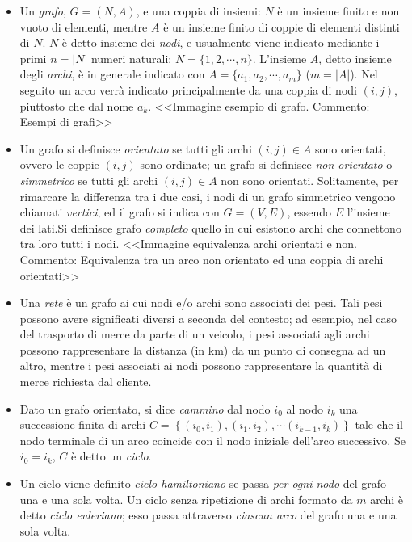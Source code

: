 	\begin{itemize}
		\item Un \emph{grafo}, $G = (N, A)$, e una coppia di insiemi: $N$ è un insieme finito e non vuoto di elementi, mentre $A$ è un insieme finito di coppie di elementi distinti di $N$.
		$N$ è detto insieme dei \emph{nodi}, e usualmente viene indicato mediante i primi $n = |N|$ numeri naturali: $N = \{1 , 2 , \cdots , n \}$. L’insieme $A$, detto insieme degli \emph{archi}, è in generale indicato con $A = \{ a_1 , a_2 , \cdots , a_m \}$ ($m = |A|$). 
		Nel seguito un arco verrà indicato principalmente da una coppia di nodi $(i,j)$, piuttosto che dal nome $a_k$.
		<<Immagine esempio di grafo. Commento: Esempi di grafi>>

		\item Un grafo si definisce \emph{orientato} se tutti gli archi $(i,j) \in A$ sono orientati, ovvero le coppie $(i,j)$ sono ordinate; un grafo si definisce \emph{non orientato} o \emph{simmetrico} se tutti gli archi $(i,j) \in A$ non sono orientati. 
		Solitamente, per rimarcare la differenza tra i due casi, i nodi di un grafo simmetrico vengono chiamati \emph{vertici}, ed il grafo si indica con $G = (V,E)$, essendo $E$ l’insieme dei lati.Si definisce grafo \emph{completo} quello in cui esistono archi che connettono tra loro tutti i nodi.
		<<Immagine equivalenza archi orientati e non. Commento: Equivalenza tra un arco non orientato ed una coppia di archi orientati>>

		\item Una \emph{rete} è un grafo ai cui nodi e/o archi sono associati dei pesi. Tali pesi possono avere significati diversi a seconda del contesto; ad esempio, nel caso del trasporto di merce da parte di un veicolo, i pesi associati agli archi possono rappresentare la distanza (in km) da un punto di consegna ad un altro, mentre i pesi associati ai nodi possono rappresentare la quantità di merce richiesta dal cliente.

		\item Dato un grafo orientato, si dice \emph{cammino} dal nodo $i_0$ al nodo $i_k$ una successione finita di archi $C = \left \{ (i_0, i_1),(i_1, i_2), \cdots (i_{k-1}, i_k) \right \}$ tale che il nodo terminale di un arco coincide con il nodo iniziale dell’arco successivo. Se $i_0 = i_k$, $C$ è detto un \emph{ciclo}.

		\item Un ciclo viene definito \emph{ciclo hamiltoniano} se passa \emph{per ogni nodo} del grafo una e una sola volta. Un ciclo senza ripetizione di archi formato da $m$ archi è detto \emph{ciclo euleriano}; esso passa attraverso \emph{ciascun arco} del grafo una e una sola volta. 
	\end{itemize}
